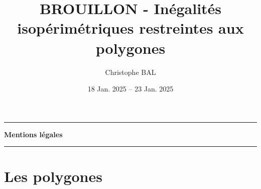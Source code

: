 \documentclass[12pt]{amsart}
\begin{document}
\title{BROUILLON - Inégalités isopérimétriques restreintes aux polygones}
\author{Christophe BAL}
\date{18 Jan. 2025 -- 23 Jan. 2025}
\maketitle


\begin{center}
	\hrule\vspace{.3em}
	{
		\fontsize{1.35em}{1em}\selectfont
		\textbf{Mentions \og légales \fg}
	}
			
	\vspace{0.45em}
	\doclicenseThis
	\hrule
\end{center}



\setcounter{tocdepth}{2}
\tableofcontents




\newpage

%
%
%
%
%
%
%
%
%
%
%
%
%
%
%
%
%
%
%
%
%
%
%
%
%
%
%
%
%
%
%
%
%
%
%
%
\section{Les polygones}


\end{document}
